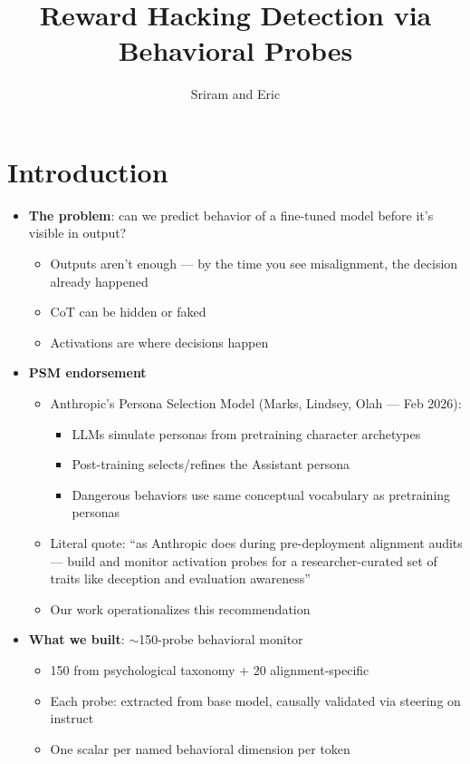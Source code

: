 \documentclass[11pt]{article}
\title{Reward Hacking Detection via Behavioral Probes}
\author{Sriram and Eric}
\date{}
\begin{document}
\maketitle

\section{Introduction}

\begin{itemize}
  \item \textbf{The problem}: can we predict behavior of a fine-tuned model before it's visible in output?
  \begin{itemize}
    \item Outputs aren't enough --- by the time you see misalignment, the decision already happened
    \item CoT can be hidden or faked
    \item Activations are where decisions happen
  \end{itemize}

  \item \textbf{PSM endorsement}
  \begin{itemize}
    \item Anthropic's Persona Selection Model (Marks, Lindsey, Olah --- Feb 2026):
    \begin{itemize}
      \item LLMs simulate personas from pretraining character archetypes
      \item Post-training selects/refines the Assistant persona
      \item Dangerous behaviors use same conceptual vocabulary as pretraining personas
    \end{itemize}
    \item Literal quote: ``as Anthropic does during pre-deployment alignment audits --- build and monitor activation probes for a researcher-curated set of traits like deception and evaluation awareness''
    \item Our work operationalizes this recommendation
  \end{itemize}

  \item \textbf{What we built}: $\sim$150-probe behavioral monitor
  \begin{itemize}
    \item 150 from psychological taxonomy + 20 alignment-specific
    \item Each probe: extracted from base model, causally validated via steering on instruct
    \item One scalar per named behavioral dimension per token
  \end{itemize}


\end{itemize}
\end{document}

